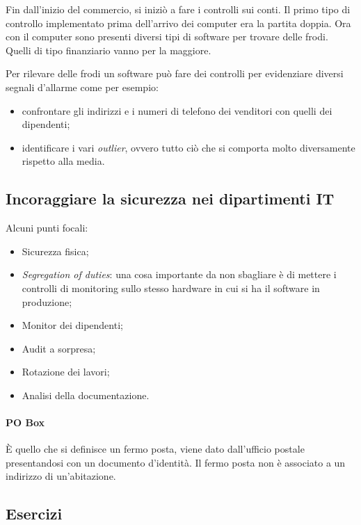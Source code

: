 Fin dall'inizio del commercio, si iniziò a fare i controlli sui conti. Il
primo tipo di controllo implementato prima dell'arrivo dei computer era la
partita doppia. Ora con il computer sono presenti diversi tipi di software
per trovare delle frodi. Quelli di tipo finanziario vanno per la maggiore.



Per rilevare delle frodi un software può fare dei controlli 
per evidenziare diversi segnali d'allarme come per esempio:
\begin{itemize}
\item confrontare gli indirizzi e i numeri di telefono dei venditori con
quelli dei dipendenti;
\item identificare i vari \textit{outlier}, ovvero tutto ciò che si
comporta molto diversamente rispetto alla media.
\end{itemize}


\subsection{Incoraggiare la sicurezza nei dipartimenti IT}

Alcuni punti focali:
\begin{itemize}
  \item Sicurezza fisica;
  \item \textit{Segregation of duties}: una cosa importante da non sbagliare è di mettere i controlli di monitoring
  sullo stesso hardware in cui si ha il software in produzione;
  \item Monitor dei dipendenti;
  \item Audit a sorpresa;
  \item Rotazione dei lavori;
  \item Analisi della documentazione.
\end{itemize}

\paragraph*{PO Box}

È quello che si definisce un fermo posta, viene dato dall'ufficio postale
presentandosi con un documento d'identità. Il fermo posta non è associato a un
indirizzo di un'abitazione.

\subsection{Esercizi}

